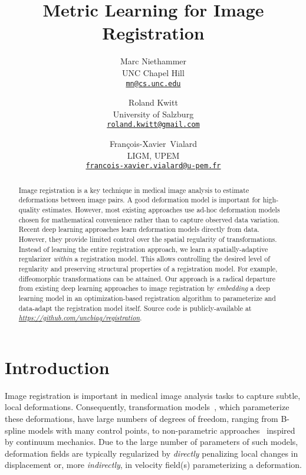 \documentclass[10pt,twocolumn,letterpaper,table]{article}
\title{Metric Learning for Image Registration}
\author{Marc Niethammer\\
UNC Chapel Hill\\
{\tt\small \href{mailto:mn@cs.unc.edu}{mn@cs.unc.edu}}
\and
Roland Kwitt\\
University of Salzburg\\
{\tt\small \href{mailto:roland.kwitt@gmail.com}{roland.kwitt@gmail.com}}
\and
Fran\c{c}ois-Xavier~Vialard\\
LIGM, UPEM\\
{\tt\small \href{mailto:francois-xavier.vialard@u-pem.fr}{francois-xavier.vialard@u-pem.fr}}}
\numberwithin{equation}{section}
\theoremstyle{plain}
\theoremstyle{definition}
\begin{document}
\setlength{\abovedisplayskip}{0.65\abovedisplayskip}
\setlength{\belowdisplayskip}{0.65\belowdisplayskip}

\maketitle

\begin{abstract}
Image registration is a key technique in medical image analysis to estimate deformations between image pairs. A good deformation model is important for high-quality estimates. However, most existing approaches use ad-hoc deformation models chosen for mathematical convenience rather than to capture observed data variation. Recent deep learning approaches learn deformation models directly from data. However, they provide limited control over the spatial regularity of transformations. Instead of learning the entire registration approach, we learn a spatially-adaptive regularizer \emph{within} a registration model. This allows controlling the desired level of regularity and preserving structural properties of a registration model. For example, diffeomorphic transformations can be attained. Our approach is a radical departure from existing deep learning approaches to image registration by {\it embedding} a deep learning model in an optimization-based registration algorithm to parameterize and data-adapt the registration model itself. Source code is publicly-available at \textit{\url{https://github.com/uncbiag/registration}}.
\end{abstract}

\vspace{-0.5cm}

\section{Introduction}
\label{sec:intro}

Image registration is important in medical image analysis tasks to capture subtle, local deformations. Consequently, transformation models~\cite{holden2008review}, which parameterize these deformations, have large numbers of degrees of freedom, ranging from B-spline models with many control points, to non-parametric approaches~\cite{modersitzki2004numerical} inspired by continuum mechanics. Due to the large number of parameters of such models, deformation fields are typically regularized by \emph{directly} penalizing local changes in displacement or, more \emph{indirectly}, in velocity field(s) parameterizing a deformation.
\end{document}
